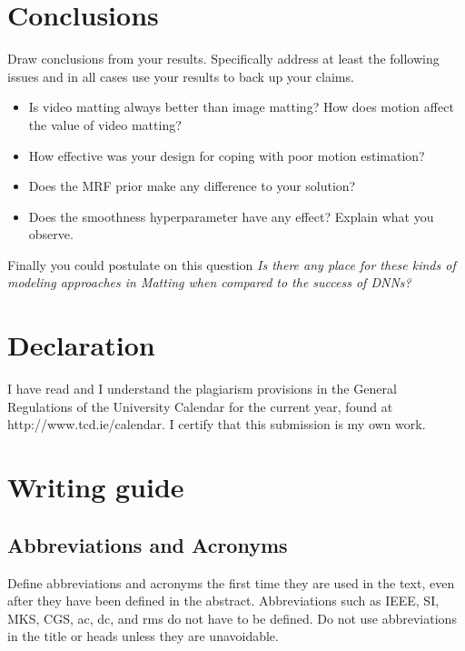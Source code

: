 \documentclass[conference]{IEEEtran}
\begin{document}
\section{Conclusions}
Draw conclusions from your results. Specifically address at least the following issues and in all cases use your results to back up your claims.
\begin{itemize}
    \item Is video matting always better than image matting? How does motion affect the value of video matting?
    \item How effective was your design for coping with poor motion estimation?
    \item Does the MRF prior make any difference to your solution? 
    \item Does the smoothness hyperparameter have any effect? Explain what you observe.
     
\end{itemize}

Finally you could postulate on this question {\em Is there any place for these kinds of modeling approaches in Matting when compared to the success of DNNs?}



{\color{red}
\section{Declaration}
I have read and I understand the plagiarism provisions in the General Regulations of the University Calendar for the current year, found at http://www.tcd.ie/calendar. I certify that this submission is my own work.}







\appendix
\section{Writing guide}
\subsection{Abbreviations and Acronyms}\label{AA}
Define abbreviations and acronyms the first time they are used in the text, 
even after they have been defined in the abstract. Abbreviations such as 
IEEE, SI, MKS, CGS, ac, dc, and rms do not have to be defined. Do not use 
abbreviations in the title or heads unless they are unavoidable.
\end{document}
